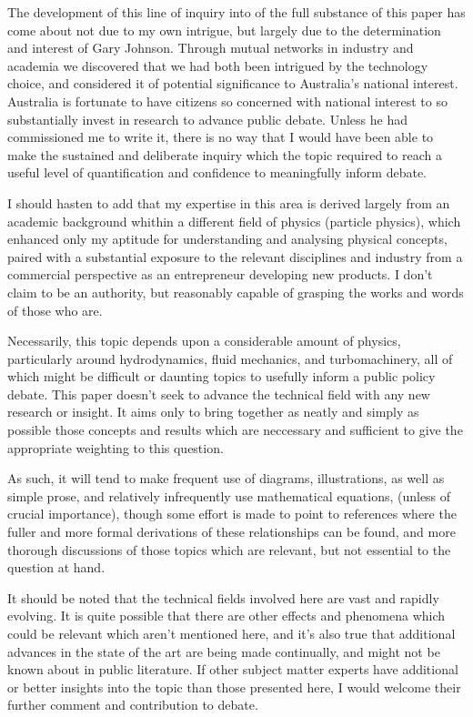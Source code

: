 \documentclass{article}\usepackage[]{graphicx}\usepackage[]{color}
\begin{document}
The development of this line of inquiry into of the full substance of this paper has come about not due to my own intrigue, but largely due to the determination and interest of Gary Johnson.  Through mutual networks in industry and academia we discovered that we had both been intrigued by the technology choice, and considered it of potential significance to Australia's national interest. Australia is fortunate to have citizens so concerned with national interest to so substantially invest in research to advance public debate.  Unless he had commissioned me to write it, there is no way that I would have been able to make the sustained and deliberate inquiry which the topic required to reach a useful level of quantification and confidence to meaningfully inform debate.

I should hasten to add that my expertise in this area is derived largely from an academic background whithin a different field of physics (particle physics), which enhanced only my aptitude for understanding and analysing physical concepts, paired with a substantial exposure to the relevant disciplines and industry from a commercial perspective as an entrepreneur developing new products.  I don't claim to be an authority, but reasonably capable of grasping the works and words of those who are.

Necessarily, this topic depends upon a considerable amount of physics, particularly around hydrodynamics, fluid mechanics, and turbomachinery, all of which might be difficult or daunting topics to usefully inform a public policy debate.  This paper doesn't seek to advance the technical field with any new research or insight.  It aims only to bring together as neatly and simply as possible those concepts and results which are neccessary and sufficient to give the appropriate weighting to this question.

As such, it will tend to make frequent use of diagrams, illustrations, as well as simple prose, and relatively infrequently use mathematical equations, (unless of crucial importance), though some effort is made to point to references where the fuller and more formal derivations of these relationships can be found, and more thorough discussions of those topics which are relevant, but not essential to the question at hand.

It should be noted that the technical fields involved here are vast and rapidly evolving.  It is quite possible that there are other effects and phenomena which could be relevant which aren't mentioned here, and it's also true that additional advances in the state of the art are being made continually, and might not be known about in public literature.  If other subject matter experts have additional or better insights into the topic than those presented here, I would welcome their further comment and contribution to debate.
\end{document}
